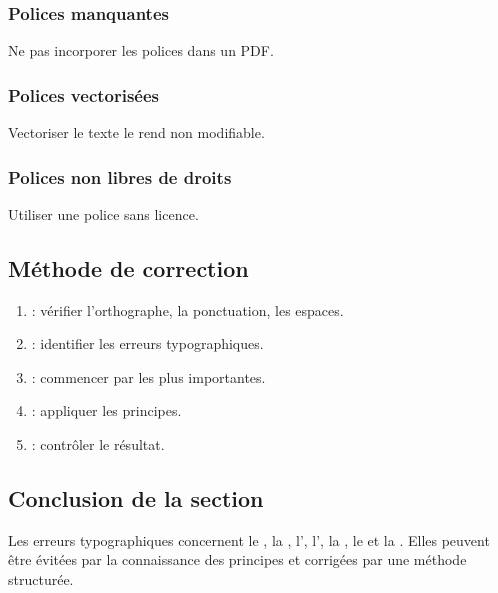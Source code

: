 \subsubsection{Polices manquantes}

Ne pas incorporer les polices dans un PDF.

\subsubsection{Polices vectorisées}

Vectoriser le texte le rend non modifiable.

\subsubsection{Polices non libres de droits}

Utiliser une police sans licence.

\subsection{Méthode de correction}

\begin{enumerate}
    \item {} : vérifier l'orthographe, la ponctuation, les espaces.
    \item {} : identifier les erreurs typographiques.
    \item {} : commencer par les plus importantes.
    \item {} : appliquer les principes.
    \item {} : contrôler le résultat.
\end{enumerate}

\subsection*{Conclusion de la section}

\begin{retenir}
Les erreurs typographiques concernent le , la , l', l', la , le  et la . Elles peuvent être évitées par la connaissance des principes et corrigées par une méthode structurée.
\end{retenir}

